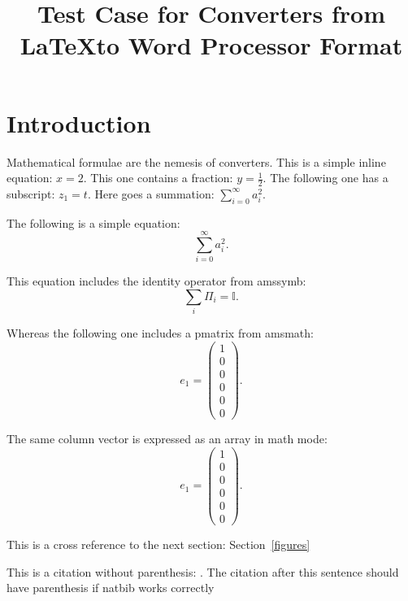 \documentclass{article}
\title{Test Case for Converters from \LaTeX to Word Processor Format}
\author{}
\begin{document}
\maketitle

\section{Introduction}
Mathematical formulae are the nemesis of converters. This is a simple inline equation: $x=2$. This one contains a fraction: $y=\frac{1}{2}$. The following one has a subscript: $z_{1}=t$. Here goes a summation: $\sum_{i=0}^{\infty}a_{i}^{2}$.

The following is a simple equation:
\begin{equation}
  \sum_{i=0}^{\infty}a_{i}^{2}.
\end{equation}

This equation includes the identity operator from amssymb:
\begin{equation}
  \sum_{i}\Pi_{i}=\mathbb{I}.
\end{equation}

Whereas the following one includes a pmatrix from amsmath:
\begin{equation}
  e_{1}=\begin{pmatrix} 1 \\ 0 \\ 0 \\ 0 \\ 0 \\0 \end{pmatrix}.
\end{equation}

The same column vector is expressed as an array in math mode:
\begin{equation}
  e_{1}=\left(\begin{array}{c} 1 \\ 0 \\ 0 \\ 0 \\ 0 \\0 \end{array}\right).
\end{equation}

This is a cross reference to the next section: Section~\ref{figures}

This is a citation without parenthesis: \cite{dummy2013least}. The citation after this sentence should have parenthesis if natbib works correctly~\citep{dummy2013least}
\end{document}
